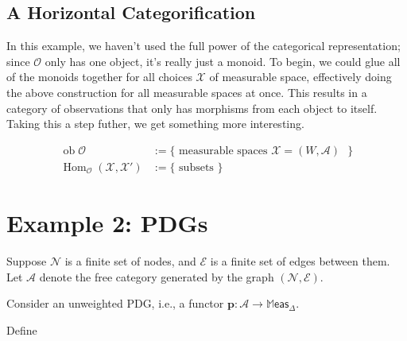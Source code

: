 \documentclass{article}
\DeclareMathOperator{\ob}{\mathrm{ob}}
\DeclareMathOperator{\Hom}{\mathrm{Hom}}
\newcommand\A{\mathcal{A}}
\newcommand\Meas{\mathbb{M}\mathsf{eas}}
\newcommand{\N}{\mathcal N}
\newcommand{\Ed}{\mathcal E}
\newcommand{\dg}[1]{\mathbdcal{#1}}
\theoremstyle{plain}
\theoremstyle{definition}
\begin{document}
    
    \subsection*{A Horizontal Categorification}
    In this example, we haven't used the full power of the categorical representation; since $\mathcal O$ only has one object, it's really just a monoid. 
    To begin, we could glue all of the monoids together for all choices $\mathcal X$ of measurable space, effectively doing the above construction for all measurable spaces at once. This results in a category of observations that only has morphisms from each object to itself.     
    Taking this a step futher, we get something more interesting.
    
    \begin{align*}
        \ob \mathcal O &:= 
            \{ \text{ measurable spaces $\mathcal X = (W, \mathcal A)$ } \}\\
        \Hom_{\mathcal O}(\mathcal X, \mathcal X') &:= 
            \Big\{ \text{ subsets } \Big\}
    \end{align*}
    
    
    \section{Example 2: PDGs}
    
    Suppose $\N$ is a finite set of nodes, and $\Ed$ is a finite set of edges between them. Let $\A$ denote the free category generated by the graph $(\N, \Ed)$. 
        
    Consider an unweighted PDG, i.e., a functor $\mathbf p : \A \to \Meas_\Delta$.
    
    
    
    Define 
    
\end{document}
